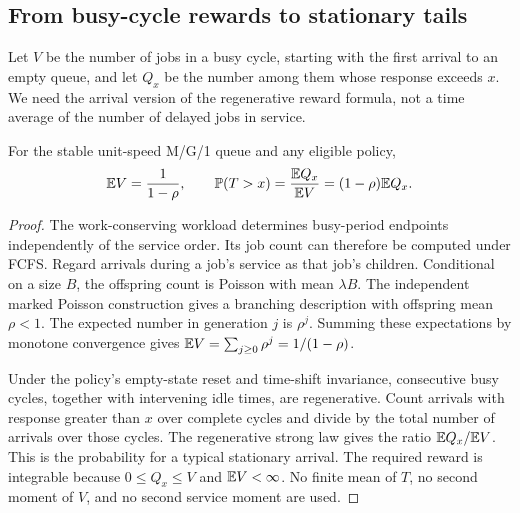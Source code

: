 \subsection{From busy-cycle rewards to stationary tails}
Let $V$ be the number of jobs in a busy cycle, starting with the first arrival to an empty queue, and let $Q_x$ be the number among them whose response exceeds $x$. We need the arrival version of the regenerative reward formula, not a time average of the number of delayed jobs in service.

\begin{lemma}\label{lem:cycle-reward}
For the stable unit-speed M/G/1 queue and any eligible policy,
\begin{equation}\label{eq:cycle-count}
 \mathbb E V=\frac1{1-\rho},\qquad
 \mathbb P(T>x)=\frac{\mathbb E Q_x}{\mathbb E V}=(1-\rho)\mathbb E Q_x.
\end{equation}
\end{lemma}
\begin{proof}
The work-conserving workload determines busy-period endpoints independently of the service order. Its job count can therefore be computed under FCFS. Regard arrivals during a job's service as that job's children. Conditional on a size $B$, the offspring count is Poisson with mean $\lambda B$. The independent marked Poisson construction gives a branching description with offspring mean $\rho<1$. The expected number in generation $j$ is $\rho^j$. Summing these expectations by monotone convergence gives $\mathbb E V=\sum_{j\geq0}\rho^j=1/(1-\rho)$.

Under the policy's empty-state reset and time-shift invariance, consecutive busy cycles, together with intervening idle times, are regenerative. Count arrivals with response greater than $x$ over complete cycles and divide by the total number of arrivals over those cycles. The regenerative strong law gives the ratio $\mathbb E Q_x/\mathbb E V$. This is the probability for a typical stationary arrival. The required reward is integrable because $0\leq Q_x\leq V$ and $\mathbb E V<\infty$. No finite mean of $T$, no second moment of $V$, and no second service moment are used.
\end{proof}

